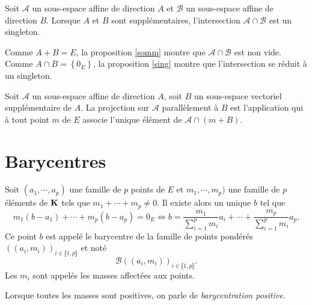 \begin{propn}\label{supp}
 Soit $\mathcal A$ un sous-espace affine de direction $A$ et $\mathcal B$ un sous-espace affine de direction $B$. Lorsque $A$ et $B$ sont supplémentaires, l'intersection $\mathcal A\cap \mathcal B$ est un singleton.
\end{propn}
\begin{demo}
Comme $A+B=E$, la proposition \ref{somm} montre que $\mathcal{A}\cap \mathcal{B}$ est non vide. Comme $A\cap B=\left\lbrace 0_E\right\rbrace$, la proposition \ref{sing} montre que l'intersection se réduit à un singleton. 
\end{demo}
\begin{defi}
 Soit $\mathcal A$ un sous-espace affine de direction $A$, soit $B$ un sous-espace vectoriel supplémentaire de $A$. La projection sur $\mathcal A$ parallèlement à $B$ est l'application qui à tout point $m$ de $E$ associe l'unique élément de $\mathcal A \cap(m+B)$.
\end{defi}

\section{Barycentres}
\begin{propdef}
  Soit $(a_1,\cdots,a_p)$ une famille de $p$ points de $E$ et $m_1,\cdots,m_p)$ une famille de $p$ éléments de $\mathbf{K}$ tels que $m_1 + \cdots + m_p \neq 0$. Il existe alors un unique $b$ tel que 
\begin{displaymath}
  m_1(b-a_1) + \cdots + m_p(b-a_p) = 0_E 
  \Leftrightarrow b = \frac{m_1}{\sum_{i=1}^pm_i}a_i + \cdots + \frac{m_p}{\sum_{i=1}^pm_i}a_p .
\end{displaymath}
Ce point $b$ est appelé le barycentre de la famille de points pondérés $((a_i,m_i))_{i\in\llbracket 1,p \rrbracket}$ et noté 
\begin{displaymath}
  \mathcal{B}((a_i,m_i))_{i\in\llbracket 1,p \rrbracket} .
\end{displaymath}
Les $m_i$ sont appelés les masses affectées aux points.
\end{propdef}
\begin{rem}
 Lorsque toutes les masses sont positives, on parle de \emph{barycentration positive}.
\end{rem}

